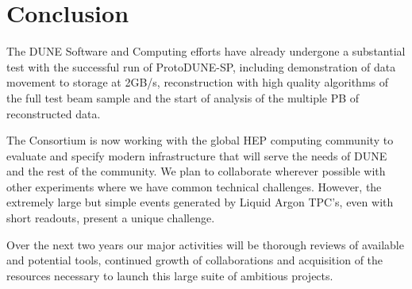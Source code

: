 \section{Conclusion}

The DUNE Software and Computing efforts have already undergone a substantial test with the successful run of ProtoDUNE-SP, including demonstration of data movement to storage at 2GB/s, reconstruction with high quality algorithms of the full test beam sample and the start of analysis of the multiple PB of reconstructed data. 

The Consortium is now working with the global HEP computing community to evaluate and specify modern infrastructure that will serve the needs of DUNE and the rest of the community.  We plan to collaborate wherever possible with other experiments where we have common technical challenges. However, the extremely large but simple events generated by Liquid Argon TPC's, even with short readouts, present a unique challenge. 

Over the next two years our major activities  will be  thorough reviews of available and potential tools, continued growth of collaborations and acquisition of the resources necessary to launch this large suite of ambitious projects. 





